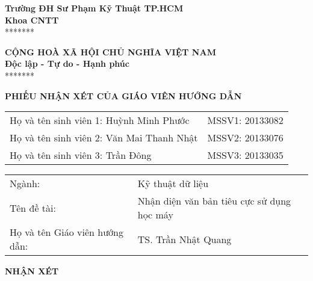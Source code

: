 
\noindent\begin{minipage}[t]{0.43\textwidth}
    \centering
    \fontsize{11pt}{16.5pt}
    \textbf{Trường ĐH Sư Phạm Kỹ Thuật TP.HCM}\\
    \textbf{Khoa CNTT}\\
    *******
\end{minipage}
\begin{minipage}[t]{0.56\textwidth}
    \centering
    \fontsize{11pt}{16.5pt}
    \textbf{CỘNG HOÀ XÃ HỘI CHỦ NGHĨA VIỆT NAM}\\
    \textbf{Độc lập - Tự do - Hạnh phúc}\\
    *******
\end{minipage}
\begin{center}
    \fontsize{18pt}{27pt}
    \textbf{PHIẾU NHẬN XÉT CỦA GIÁO VIÊN HƯỚNG DẪN}
\end{center}
\begin{table}[!h]
    \centering
    \begin{tabularx}{0.8\textwidth}{ X c }
        Họ và tên sinh viên 1: Huỳnh Minh Phước   & MSSV1: 20133082 \\
        Họ và tên sinh viên 2: Văn Mai Thanh Nhật & MSSV2: 20133076 \\
        Họ và tên sinh viên 3: Trần Đông          & MSSV3: 20133035 \\
    \end{tabularx}
\end{table}
\begin{center}
    \begin{tabular}{p{} p{}}
        Ngành:                         & Kỹ thuật dữ liệu                           \\
        Tên đề tài:                    & Nhận diện văn bản tiêu cực sử dụng học máy \\
        Họ và tên Giáo viên hướng dẫn: & TS. Trần Nhật Quang
    \end{tabular}
\end{center}
\textbf{NHẬN XÉT}
